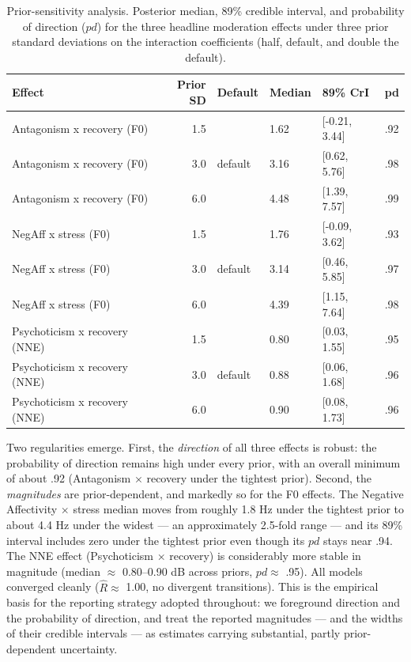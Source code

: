 \documentclass[
  english,
  man,floatsintext]{apa6}
\begin{document}
\begin{table}[H]
\centering
\caption{\label{tab:table-prior-sensitivity}Prior-sensitivity analysis. Posterior median, 89\% credible interval, and probability of direction ($pd$) for the three headline moderation effects under three prior standard deviations on the interaction coefficients (half, default, and double the default).}
\centering
\fontsize{9}{11}\selectfont
\begin{tabular}[t]{lrllll}
\toprule
Effect & Prior SD & Default & Median & 89\% CrI & pd\\
\midrule
Antagonism x recovery (F0) & 1.5 &  & 1.62 & {}[-0.21, 3.44] & .92\\
Antagonism x recovery (F0) & 3.0 & default & 3.16 & {}[0.62, 5.76] & .98\\
Antagonism x recovery (F0) & 6.0 &  & 4.48 & {}[1.39, 7.57] & .99\\
NegAff x stress (F0) & 1.5 &  & 1.76 & {}[-0.09, 3.62] & .93\\
NegAff x stress (F0) & 3.0 & default & 3.14 & {}[0.46, 5.85] & .97\\
\addlinespace
NegAff x stress (F0) & 6.0 &  & 4.39 & {}[1.15, 7.64] & .98\\
Psychoticism x recovery (NNE) & 1.5 &  & 0.80 & {}[0.03, 1.55] & .95\\
Psychoticism x recovery (NNE) & 3.0 & default & 0.88 & {}[0.06, 1.68] & .96\\
Psychoticism x recovery (NNE) & 6.0 &  & 0.90 & {}[0.08, 1.73] & .96\\
\bottomrule
\end{tabular}
\end{table}

Two regularities emerge. First, the \emph{direction} of all three effects is robust: the
probability of direction remains high under every prior, with an overall minimum of about
.92 (Antagonism \(\times\) recovery under the tightest prior). Second, the \emph{magnitudes} are
prior-dependent, and markedly so for the F0 effects. The Negative Affectivity \(\times\)
stress median moves from roughly 1.8 Hz under the tightest prior to about 4.4 Hz under the
widest --- an approximately 2.5-fold range --- and its 89\% interval includes zero under the
tightest prior even though its \(pd\) stays near .94. The NNE effect (Psychoticism \(\times\)
recovery) is considerably more stable in magnitude (median \(\approx\) 0.80--0.90 dB across
priors, \(pd \approx\) .95). All models converged cleanly (\(\hat{R} \approx\) 1.00, no
divergent transitions). This is the empirical basis for the reporting strategy adopted
throughout: we foreground direction and the probability of direction, and treat the
reported magnitudes --- and the widths of their credible intervals --- as estimates carrying
substantial, partly prior-dependent uncertainty.
\end{document}
